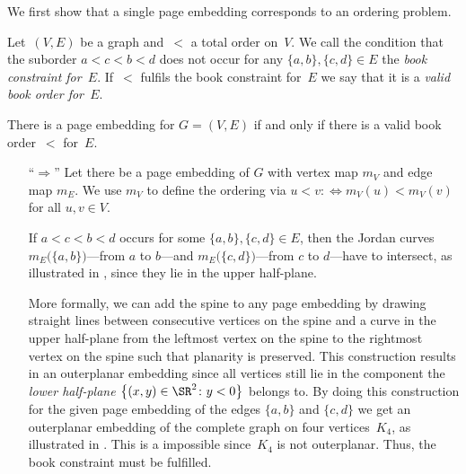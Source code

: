 We first show that a single page embedding corresponds to an ordering problem.
\begin{definition}\label{def:book-constraint}
Let~$(V, E)$ be a graph and~$<$ a total order on~$V$.
We call the condition that the suborder $a < c < b < d$ does not occur for any $\{a, b\}, \{c, d\} \in E$ the
\emph{book constraint for~$E$}. If~$<$ fulfils the book constraint for~$E$ we say that it is a \emph{valid book order for~$E$}. 
\end{definition}
\begin{lemma}
\label{lemma:constraints}
There is a page embedding for $G = (V, E)$ if and only if there is a valid book order~$<$ 
for~$E$.
\end{lemma}
\begin{myproof}
\begin{itemize}
\item[]
\item[``$\Rightarrow$'']
Let there be a page embedding of $G$ with vertex map $m_V$ and
edge map $m_E$. We use $m_V$ to define the
ordering via $u < v :\Leftrightarrow m_V(u) < m_V(v)$ for all $u, v \in V$.

If $a < c < b < d$ occurs for some $\{a, b\}, \{c, d\} \in E$, then the Jordan curves
$m_E\bigl(\{a, b\}\bigr)$---from $a$ to $b$---and $m_E\bigl(\{c, d\}\bigr)$---from $c$
to $d$---have to intersect, as illustrated in , since they lie in the upper half-plane. 

More formally, we can add the spine to any page embedding by drawing straight lines between 
consecutive vertices on the spine and a curve in the upper half-plane from the leftmost vertex on the spine to the
rightmost vertex on the spine such that planarity is preserved.
This construction results in an outerplanar embedding since  all vertices still lie in the component the \emph{lower half-plane $\bigl\{(x, y) \in \SR^2\colon y < 0\bigr\}$} belongs to. By doing this
construction for the given page embedding of the edges $\{a, b\}$ and  $\{c, d\}$ we get
an outerplanar embedding of the complete graph on four vertices~$K_4$, as illustrated in . This is a impossible since~$K_4$ is not outerplanar. Thus, the
book constraint must be fulfilled.



\end{itemize}
\end{myproof}
